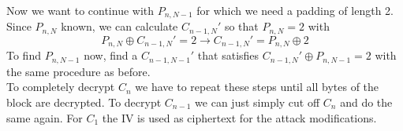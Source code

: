 Now we want to continue with $P_{n,N-1}$ for which we need a padding of length 2.
Since $P_{n,N}$ known, we can calculate $C_{n-1,N}'$ so that $P_{n,N} = 2$ with
\begin{equation*}
  P_{n,N} \oplus C_{n-1,N}' = 2 \rightarrow C_{n-1,N}' = P_{n,N} \oplus 2
\end{equation*}
To find $P_{n,N-1}$ now, find a $C_{n-1,N-1}'$ that satisfies $C_{n-1,N}' \oplus P_{n,N-1} = 2$ with the same procedure as before.\\
To completely decrypt $C_n$ we have to repeat these steps until all bytes of the block are decrypted.
To decrypt $C_{n-1}$ we can just simply cut off $C_n$ and do the same again.
For $C_1$ the IV is used as ciphertext for the attack modifications.
